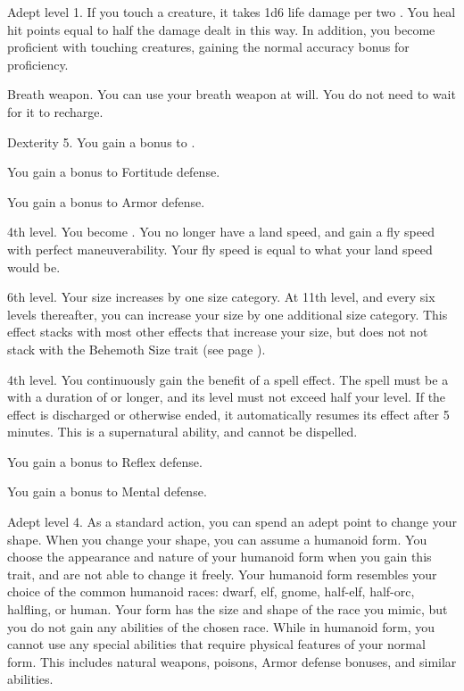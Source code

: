     \featpre Adept level 1.
    \featben If you touch a creature, it takes 1d6 life damage  per two .
    You heal hit points equal to half the damage dealt in this way.
    In addition, you become proficient with touching creatures, gaining the normal  accuracy bonus for proficiency.

    \featpre Breath weapon.
    \featben You can use your breath weapon at will.
    You do not need to wait for it to recharge.

    \featpre Dexterity 5.
    \featben You gain a  bonus to .

    \featben You gain a  bonus to Fortitude defense.

    \featben You gain a  bonus to Armor defense.

    \featpre 4th level.
    \featben You become .
    You no longer have a land speed, and gain a fly speed with perfect maneuverability.
    Your fly speed is equal to what your land speed would be.

    \featpre 6th level.
    \featben Your size increases by one size category.
    At 11th level, and every six levels thereafter, you can increase your size by one additional size category.
    This effect stacks with most other effects that increase your size, but does not not stack with the Behemoth Size trait (see page ).

    \featpre 4th level.
    \featben You continuously gain the benefit of a spell effect.
    The spell must be a  with a duration of \durshort or longer, and its level must not exceed half your level.
    If the effect is discharged or otherwise ended, it automatically resumes its effect after 5 minutes.
    This is a supernatural ability, and cannot be dispelled.

    \featben You gain a  bonus to Reflex defense.

    \featben You gain a  bonus to Mental defense.

    \featpre Adept level 4.
    \featben As a standard action, you can spend an adept point to change your shape.
    When you change your shape, you can assume a humanoid form.
    You choose the appearance and nature of your humanoid form when you gain this trait, and are not able to change it freely.
    Your humanoid form resembles your choice of the common humanoid races: dwarf, elf, gnome, half-elf, half-orc, halfling, or human.
    Your form has the size and shape of the race you mimic, but you do not gain any abilities of the chosen race.
    While in humanoid form, you cannot use any special abilities that require physical features of your normal form.
    This includes natural weapons, poisons, Armor defense bonuses, and similar abilities.

